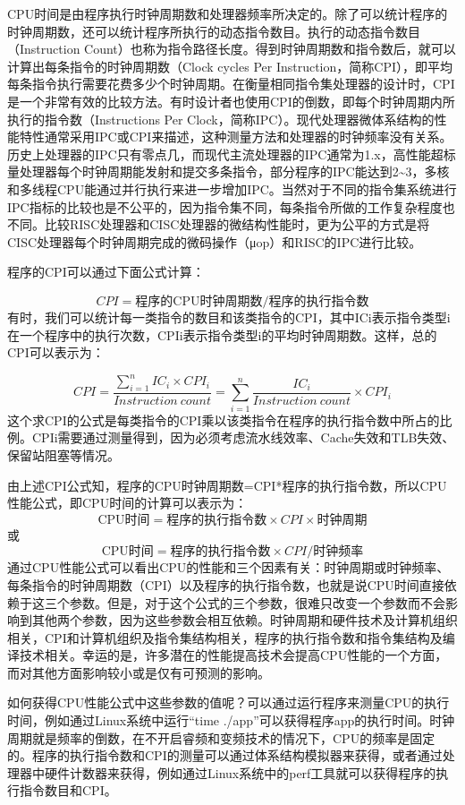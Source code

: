 \documentclass[]{ctexbook}
\begin{document}
CPU时间是由程序执行时钟周期数和处理器频率所决定的。除了可以统计程序的时钟周期数，还可以统计程序所执行的动态指令数目。执行的动态指令数目（Instruction Count）也称为指令路径长度。得到时钟周期数和指令数后，就可以计算出每条指令的时钟周期数（Clock cycles Per Instruction，简称CPI），即平均每条指令执行需要花费多少个时钟周期。在衡量相同指令集处理器的设计时，CPI是一个非常有效的比较方法。有时设计者也使用CPI的倒数，即每个时钟周期内所执行的指令数（Instructions Per Clock，简称IPC）。现代处理器微体系结构的性能特性通常采用IPC或CPI来描述，这种测量方法和处理器的时钟频率没有关系。历史上处理器的IPC只有零点几，而现代主流处理器的IPC通常为1.x，高性能超标量处理器每个时钟周期能发射和提交多条指令，部分程序的IPC能达到2\textasciitilde3，多核和多线程CPU能通过并行执行来进一步增加IPC。当然对于不同的指令集系统进行IPC指标的比较也是不公平的，因为指令集不同，每条指令所做的工作复杂程度也不同。比较RISC处理器和CISC处理器的微结构性能时，更为公平的方式是将CISC处理器每个时钟周期完成的微码操作（μop）和RISC的IPC进行比较。

程序的CPI可以通过下面公式计算：

\[
CPI = \mbox{程序的CPU时钟周期数}/\mbox{程序的执行指令数}
\]
有时，我们可以统计每一类指令的数目和该类指令的CPI，其中ICi表示指令类型i在一个程序中的执行次数，CPIi表示指令类型i的平均时钟周期数。这样，总的CPI可以表示为：

\[
CPI = \frac{\sum^{n}_{i=1}IC_i\times CPI_i}{Instruction\ count} = \sum^{n}_{i=1}\frac{IC_i}{Instruction\ count}\times CPI_i
\]
这个求CPI的公式是每类指令的CPI乘以该类指令在程序的执行指令数中所占的比例。CPIi需要通过测量得到，因为必须考虑流水线效率、Cache失效和TLB失效、保留站阻塞等情况。

由上述CPI公式知，程序的CPU时钟周期数=CPI*程序的执行指令数，所以CPU性能公式，即CPU时间的计算可以表示为：
\[
\mbox{CPU时间}=\mbox{程序的执行指令数}\times CPI \times \mbox{时钟周期}
\]
或
\[
\mbox{CPU时间}={程序的执行指令数}\times CPI/\mbox{时钟频率}
\]
通过CPU性能公式可以看出CPU的性能和三个因素有关：时钟周期或时钟频率、每条指令的时钟周期数（CPI）以及程序的执行指令数，也就是说CPU时间直接依赖于这三个参数。但是，对于这个公式的三个参数，很难只改变一个参数而不会影响到其他两个参数，因为这些参数会相互依赖。时钟周期和硬件技术及计算机组织相关，CPI和计算机组织及指令集结构相关，程序的执行指令数和指令集结构及编译技术相关。幸运的是，许多潜在的性能提高技术会提高CPU性能的一个方面，而对其他方面影响较小或是仅有可预测的影响。

如何获得CPU性能公式中这些参数的值呢？可以通过运行程序来测量CPU的执行时间，例如通过Linux系统中运行``time ./app''可以获得程序app的执行时间。时钟周期就是频率的倒数，在不开启睿频和变频技术的情况下，CPU的频率是固定的。程序的执行指令数和CPI的测量可以通过体系结构模拟器来获得，或者通过处理器中硬件计数器来获得，例如通过Linux系统中的perf工具就可以获得程序的执行指令数目和CPI。
\end{document}

